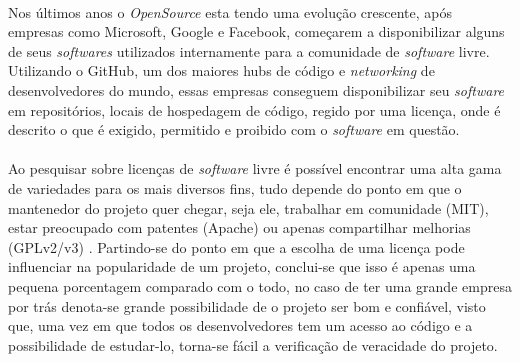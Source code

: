 \paragraph{}
Nos últimos anos o \textit{OpenSource} esta tendo uma evolução crescente, após empresas como Microsoft, Google e Facebook, começarem a disponibilizar alguns de seus \textit{softwares} utilizados internamente para a comunidade de \textit{software} livre.
Utilizando o GitHub, um dos maiores hubs de código e \textit{networking} de desenvolvedores do mundo, essas empresas conseguem disponibilizar seu \textit{software} em repositórios, locais de hospedagem de código, regido por uma licença, onde é descrito o que é exigido, permitido e proibido com o \textit{software} em questão.

\paragraph{}
Ao pesquisar sobre licenças de \textit{software} livre é possível encontrar uma alta gama de variedades para os mais diversos fins, tudo depende do ponto em que o mantenedor do projeto quer chegar, seja ele, trabalhar em comunidade (MIT), estar preocupado com patentes (Apache) ou apenas compartilhar melhorias (GPLv2/v3) \cite{choosealicense}.
Partindo-se do ponto em que a escolha de uma licença pode influenciar na popularidade de um projeto, conclui-se que isso é apenas uma pequena porcentagem comparado com o todo, no caso de ter uma grande empresa por trás denota-se grande possibilidade de o projeto ser bom e confiável, visto que, uma vez em que todos os desenvolvedores tem um acesso ao código e a possibilidade de estudar-lo, torna-se fácil a verificação de veracidade do projeto.

